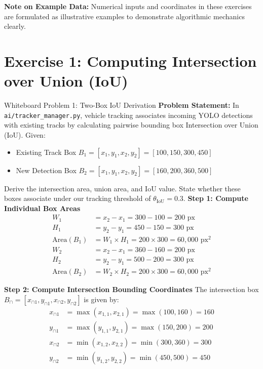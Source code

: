 \documentclass[11pt,a4paper,oneside]{report}
\begin{document}
\begin{alertnote}
\textbf{Note on Example Data:} Numerical inputs and coordinates in these exercises are formulated as illustrative examples to demonstrate algorithmic mechanics clearly.
\end{alertnote}

\section{Exercise 1: Computing Intersection over Union (IoU)}
\label{sec:wb_iou}

\begin{interviewq}{Whiteboard Problem 1: Two-Box IoU Derivation}
\textbf{Problem Statement:}
In \texttt{ai/tracker\_manager.py}, vehicle tracking associates incoming YOLO detections with existing tracks by calculating pairwise bounding box Intersection over Union (IoU). Given:
\begin{itemize}
    \item Existing Track Box $B_1 = [x_1, y_1, x_2, y_2] = [100, 150, 300, 450]$
    \item New Detection Box $B_2 = [x_1, y_1, x_2, y_2] = [160, 200, 360, 500]$
\end{itemize}
Derive the intersection area, union area, and IoU value. State whether these boxes associate under our tracking threshold of $\theta_{\text{IoU}} = 0.3$.
\tcblower
\textbf{Step 1: Compute Individual Box Areas}
\begin{align*}
W_1 &= x_2 - x_1 = 300 - 100 = 200 \text{ px} \\
H_1 &= y_2 - y_1 = 450 - 150 = 300 \text{ px} \\
\text{Area}(B_1) &= W_1 \times H_1 = 200 \times 300 = 60{,}000 \text{ px}^2 \\[6pt]
W_2 &= x_2 - x_1 = 360 - 160 = 200 \text{ px} \\
H_2 &= y_2 - y_1 = 500 - 200 = 300 \text{ px} \\
\text{Area}(B_2) &= W_2 \times H_2 = 200 \times 300 = 60{,}000 \text{ px}^2
\end{align*}

\textbf{Step 2: Compute Intersection Bounding Coordinates}
The intersection box $B_{\cap} = [x_{\cap 1}, y_{\cap 1}, x_{\cap 2}, y_{\cap 2}]$ is given by:
\begin{align*}
x_{\cap 1} &= \max(x_{1,1}, x_{2,1}) = \max(100, 160) = 160 \\
y_{\cap 1} &= \max(y_{1,1}, y_{2,1}) = \max(150, 200) = 200 \\
x_{\cap 2} &= \min(x_{1,2}, x_{2,2}) = \min(300, 360) = 300 \\
y_{\cap 2} &= \min(y_{1,2}, y_{2,2}) = \min(450, 500) = 450
\end{align*}


\end{interviewq}
\end{document}
